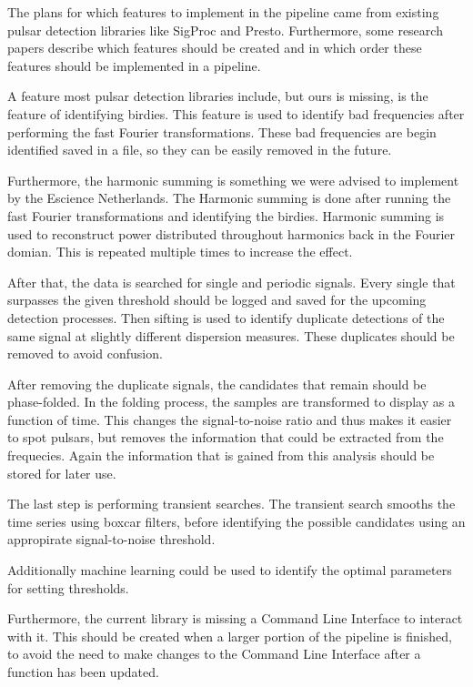 \documentclass[a4paper,11pt]{report}
\begin{document}
    The plans for which features to implement in the pipeline came from existing pulsar detection libraries like SigProc and Presto. Furthermore, some research papers describe which features should be created and
    in which order these features should be implemented in a pipeline.

    A feature most pulsar detection libraries include, but ours is missing, is the feature of identifying birdies. This feature is used to identify bad frequencies after performing the fast Fourier transformations.
    These bad frequencies are begin identified saved in a file, so they can be easily removed in the future.

    Furthermore, the harmonic summing is something we were advised to implement by the Escience Netherlands. The Harmonic summing is done after running the fast Fourier transformations and identifying the birdies.
    Harmonic summing is used to reconstruct power distributed throughout harmonics back in the Fourier domian. This is repeated multiple times to increase the effect.

    After that, the data is searched for single and periodic signals. Every single that surpasses the given threshold should be logged and saved for the upcoming detection processes.
    Then sifting is used to identify duplicate detections of the same signal at slightly different dispersion measures. These duplicates should be removed to avoid confusion.

    After removing the duplicate signals, the candidates that remain should be phase-folded. In the folding process, the samples are transformed to display as a function of time.
    This changes the signal-to-noise ratio and thus makes it easier to spot pulsars, but removes the information that could be extracted from the frequecies. Again the information 
    that is gained from this analysis should be stored for later use.

    The last step is performing transient searches. The transient search smooths the time series using boxcar filters, before identifying the possible candidates using an appropirate signal-to-noise
    threshold. 
    
    Additionally machine learning could be used to identify the optimal parameters for setting thresholds.

    Furthermore, the current library is missing a Command Line Interface to interact with it. This should be created when a larger portion of the pipeline is finished, to avoid the need
    to make changes to the Command Line Interface after a function has been updated.
\end{document}

